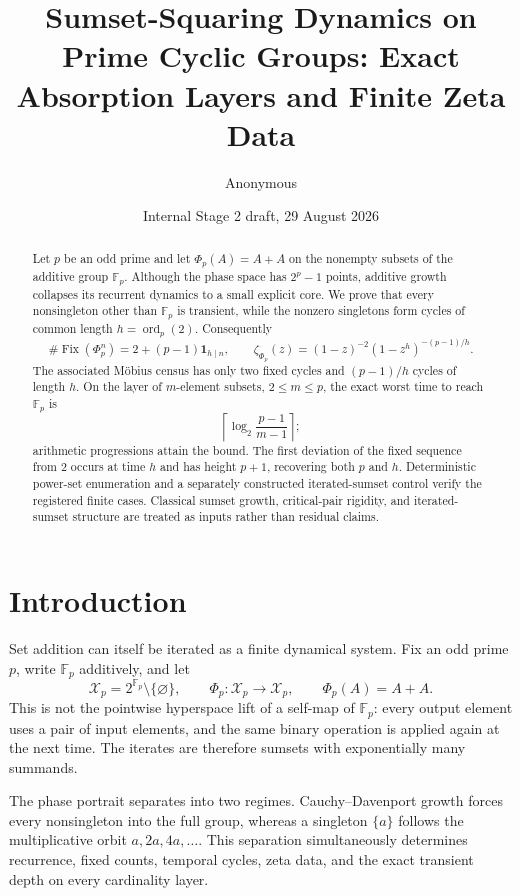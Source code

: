 \documentclass[11pt,a4paper]{amsart}
\title[Sumset-squaring dynamics]{Sumset-Squaring Dynamics on Prime Cyclic Groups:
Exact Absorption Layers and Finite Zeta Data}
\author{Anonymous}
\date{Internal Stage 2 draft, 29 August 2026}
\theoremstyle{definition}
\theoremstyle{remark}
\newcommand{\Fp}{\mathbb F_p}
\newcommand{\calX}{\mathcal X}
\begin{document}
\begin{abstract}
Let $p$ be an odd prime and let $\Phi_p(A)=A+A$ on the nonempty
subsets of the additive group $\mathbb F_p$.  Although the phase space has
$2^p-1$ points, additive growth collapses its recurrent dynamics to a small
explicit core.  We prove that every nonsingleton other than $\mathbb F_p$
is transient, while the nonzero singletons form cycles of common length
$h=\operatorname{ord}_p(2)$.  Consequently
\[
 \#\operatorname{Fix}(\Phi_p^n)
 =2+(p-1)\mathbf 1_{h\mid n},
 \qquad
 \zeta_{\Phi_p}(z)
 =(1-z)^{-2}(1-z^h)^{-(p-1)/h}.
\]
The associated M\"obius census has only two fixed cycles and
$(p-1)/h$ cycles of length $h$.  On the layer of $m$-element subsets,
$2\leq m\leq p$, the exact worst time to reach $\mathbb F_p$ is
\[
 \left\lceil\log_2\frac{p-1}{m-1}\right\rceil;
\]
arithmetic progressions attain the bound.  The first deviation of the fixed
sequence from $2$ occurs at time $h$ and has height $p+1$, recovering both
$p$ and $h$.  Deterministic power-set enumeration and a separately constructed
iterated-sumset control verify the registered finite cases.  Classical
sumset growth, critical-pair rigidity, and iterated-sumset structure are
treated as inputs rather than residual claims.
\end{abstract}

\maketitle

\section{Introduction}

Set addition can itself be iterated as a finite dynamical system.  Fix an
odd prime $p$, write $\Fp$ additively, and let
\[
 \calX_p=2^{\Fp}\setminus\{\varnothing\},
 \qquad
 \Phi_p:\calX_p\longrightarrow\calX_p,
 \qquad
 \Phi_p(A)=A+A.
\]
This is not the pointwise hyperspace lift of a self-map of $\Fp$: every
output element uses a pair of input elements, and the same binary operation
is applied again at the next time.  The iterates are therefore sumsets with
exponentially many summands.

The phase portrait separates into two regimes.  Cauchy--Davenport growth
forces every nonsingleton into the full group, whereas a singleton
$\{a\}$ follows the multiplicative orbit $a,2a,4a,\ldots$.  This separation
simultaneously determines recurrence, fixed counts, temporal cycles, zeta
data, and the exact transient depth on every cardinality layer.
\end{document}
